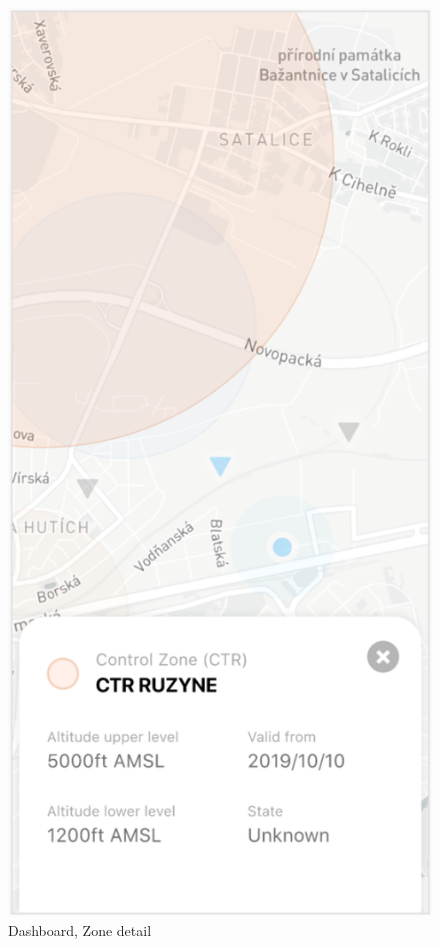 \begin{figure}
    \centering
    \begin{minipage}{.4\textwidth}
        \centering
        \includegraphics[width=.7\linewidth]{assets/user_interface_design/dashboard/dashboard_zone_detail.png}
        \caption{Dashboard, Zone detail}
        \label{fig:dashboard_zone_detail}
    \end{minipage}%
    \hspace{.05\linewidth}
    \begin{minipage}{.4\textwidth}
        \centering

\end{minipage}
\end{figure}
